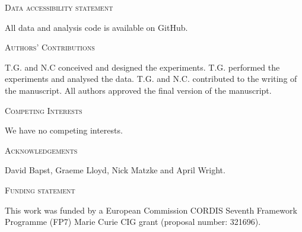 \documentclass[12pt,letterpaper]{article}
\renewcommand{\section}[1]{%
\bigskip
\begin{center}
\begin{Large}
\normalfont\scshape #1
\medskip
\end{Large}
\end{center}}
\begin{document}
\section{Data accessibility statement}
All data and analysis code is available on GitHub.
\section{Authors' Contributions}
T.G. and N.C conceived and designed the experiments. T.G. performed the experiments and analysed the data. T.G. and N.C. contributed to the writing of the manuscript. All authors approved the final version of the manuscript.
\section{Competing Interests}
We have no competing interests.
\section{Acknowledgements}
David Bapst, Graeme Lloyd, Nick Matzke and April Wright.
\section{Funding statement}
This work was funded by a European Commission CORDIS Seventh Framework Programme (FP7) Marie Curie CIG grant (proposal number: 321696).




\newcommand{\beginsupplement}{%
    \setcounter{table}{0}
    \renewcommand{\thetable}{S\arabic{table}}%
    \setcounter{figure}{0}
    \renewcommand{\thefigure}{S\arabic{figure}}%
}
\beginsupplement
%


\end{document}

